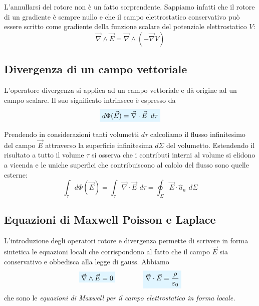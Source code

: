 \documentclass[x11names]{report}
\newcommand{\viola}[1]{%
	\colorbox{myblue}{$\displaystyle #1$}
}
\begin{document}
L'annullarsi del rotore non è un fatto sorprendente. Sappiamo infatti che il rotore di un gradiente è sempre nullo e che il campo elettrostatico conservativo può essere scritto come gradiente della funzione scalare del potenziale elettrostatico \(V\):
\[
\vec{\nabla} \wedge \vec{E} = \vec{\nabla} \wedge \left(-\vec{\nabla} V\right)
\]

\subsection{Divergenza di un campo vettoriale}
L'operatore divergenza si applica ad un campo vettoriale e dà origine ad un campo scalare. Il suo significato intrinseco è espresso da 
\begin{equation}
	\viola{d\Phi(\vec{E}) = \vec{\nabla}\cdot\vec{E}\,\ d\tau}
\end{equation}


Prendendo in considerazioni tanti volumetti \(d\tau\) calcoliamo il flusso infinitesimo del campo \(\vec{E}\) attraverso la superficie infinitesima \(d\Sigma\) del volumetto. Estendendo il risultato a tutto il volume \(\tau\) si osserva che i contributi interni al volume si elidono a vicenda e le uniche superfici che contribuiscono al calolo del flusso sono quelle esterne:
\[
\int_\tau d\Phi(\vec{E}) = \int_\tau  \vec{\nabla}\cdot\vec{E}\,\ d\tau = \oint_\Sigma \vec{E}\cdot\hat{u}_n \,\ d\Sigma
\]

\subsection{Equazioni di Maxwell Poisson e Laplace}
L'introduzione degli operatori rotore e divergenza permette di scrivere in forma sintetica le equazioni locali che corrispondono al fatto che il campo \(\vec{E}\) sia conservativo e obbedisca alla legge di gauss. Abbiamo
\begin{equation}
	\viola{\vec{\nabla} \wedge \vec{E} = 0} \qquad \qquad \viola{\vec{\nabla} \cdot \vec{E} = \frac{\rho}{\varepsilon_0}}
\end{equation}
che sono le \textit{equazioni di Maxwell per il campo elettrostatico in forma locale.} 
\end{document}
